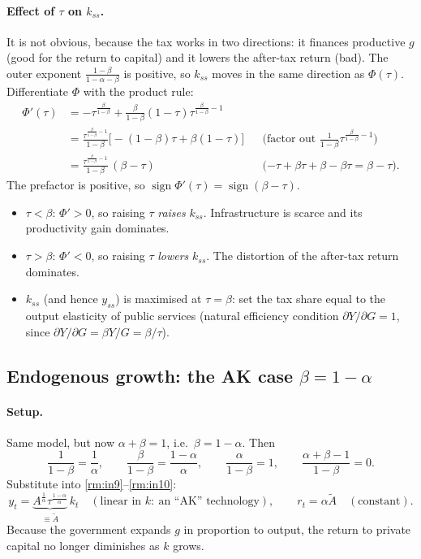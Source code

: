 \paragraph{Effect of $\tau$ on $k_{ss}$.} It is not obvious, because the tax works in two directions: it finances productive $g$ (good for the return to capital) and it lowers the after-tax return (bad). The outer exponent $\frac{1-\beta}{1-\alpha-\beta}$ is positive, so $k_{ss}$ moves in the same direction as $\Phi(\tau)$. Differentiate $\Phi$ with the product rule:
\begin{align*}
\Phi'(\tau)&=-\tau^{\frac{\beta}{1-\beta}}+\frac{\beta}{1-\beta}(1-\tau)\tau^{\frac{\beta}{1-\beta}-1}\\
&=\frac{\tau^{\frac{\beta}{1-\beta}-1}}{1-\beta}\Big[-(1-\beta)\tau+\beta(1-\tau)\Big]
&&\text{(factor out $\tfrac{1}{1-\beta}\tau^{\frac{\beta}{1-\beta}-1}$)}\\
&=\frac{\tau^{\frac{\beta}{1-\beta}-1}}{1-\beta}\,(\beta-\tau)
&&\text{($-\tau+\beta\tau+\beta-\beta\tau=\beta-\tau$).}
\end{align*}
The prefactor is positive, so $\operatorname{sign}\Phi'(\tau)=\operatorname{sign}(\beta-\tau)$.
\begin{keybox}[title={Tax and steady-state capital with productive spending}]
\begin{itemize}
\item $\tau<\beta$: $\Phi'>0$, so raising $\tau$ \emph{raises} $k_{ss}$. Infrastructure is scarce and its productivity gain dominates.
\item $\tau>\beta$: $\Phi'<0$, so raising $\tau$ \emph{lowers} $k_{ss}$. The distortion of the after-tax return dominates.
\item $k_{ss}$ (and hence $y_{ss}$) is maximised at $\tau=\beta$: set the tax share equal to the output elasticity of public services (natural efficiency condition $\partial Y/\partial G=1$, since $\partial Y/\partial G=\beta Y/G=\beta/\tau$).
\end{itemize}
\end{keybox}

\subsection{Endogenous growth: the AK case $\beta=1-\alpha$ }

\paragraph{Setup.} Same model, but now $\alpha+\beta=1$, i.e.\ $\beta=1-\alpha$. Then
\[
\frac1{1-\beta}=\frac1\alpha,\qquad \frac{\beta}{1-\beta}=\frac{1-\alpha}{\alpha},\qquad \frac{\alpha}{1-\beta}=1,\qquad \frac{\alpha+\beta-1}{1-\beta}=0 .
\]
Substitute into \eqref{rm:in9}--\eqref{rm:in10}:
\[
y_t=\underbrace{A^{\frac1\alpha}\tau^{\frac{1-\alpha}{\alpha}}}_{\equiv\tilde A}\,k_t\quad(\text{linear in }k:\ \text{an ``AK'' technology}),\qquad
r_t=\alpha\tilde A\quad(\text{constant}).
\]
Because the government expands $g$ in proportion to output, the return to private capital no longer diminishes as $k$ grows.

